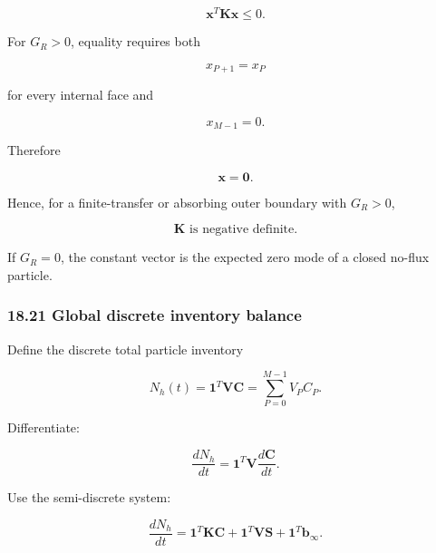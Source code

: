 \documentclass[11pt,a4paper]{article}
\begin{document}
\begin{equation}
\boxed{
\mathbf x^T\mathbf K\mathbf x\le0.
}
\tag{TRISO-FV-275}
\label{eq:triso-fv-275}
\end{equation}

For $G_R>0$, equality requires both

\begin{equation}
x_{P+1}=x_P
\tag{TRISO-FV-276}
\label{eq:triso-fv-276}
\end{equation}

for every internal face and

\begin{equation}
x_{M-1}=0.
\tag{TRISO-FV-277}
\label{eq:triso-fv-277}
\end{equation}

Therefore

\begin{equation}
\mathbf x=\mathbf0.
\tag{TRISO-FV-278}
\label{eq:triso-fv-278}
\end{equation}

Hence, for a finite-transfer or absorbing outer boundary with $G_R>0$,

\begin{equation}
\boxed{
\mathbf K
\text{ is negative definite.}
}
\tag{TRISO-FV-279}
\label{eq:triso-fv-279}
\end{equation}

If $G_R=0$, the constant vector is the expected zero mode of a closed no-flux particle.

\subsubsection*{18.21 Global discrete inventory balance}

Define the discrete total particle inventory

\begin{equation}
\boxed{
N_h(t)
=
\mathbf 1^T\mathbf V\mathbf C
=
\sum_{P=0}^{M-1}
V_PC_P.
}
\tag{TRISO-FV-280}
\label{eq:triso-fv-280}
\end{equation}

Differentiate:

\begin{equation}
\frac{dN_h}{dt}
=
\mathbf1^T
\mathbf V
\frac{d\mathbf C}{dt}.
\tag{TRISO-FV-281}
\label{eq:triso-fv-281}
\end{equation}

Use the semi-discrete system:

\begin{equation}
\frac{dN_h}{dt}
=
\mathbf1^T\mathbf K\mathbf C
+
\mathbf1^T\mathbf V\mathbf S
+
\mathbf1^T\mathbf b_\infty.
\tag{TRISO-FV-282}
\label{eq:triso-fv-282}
\end{equation}
\end{document}
